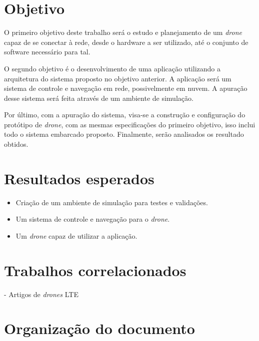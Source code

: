 \documentclass[12pt,a4paper,oneside]{book}
\begin{document}
\section{Objetivo}

O primeiro objetivo deste trabalho será o estudo e planejamento de um \textit{drone} capaz de se conectar à rede, desde o hardware a ser utilizado, até o conjunto de software necessário para tal.

O segundo objetivo é o desenvolvimento de uma aplicação utilizando a arquitetura do sistema proposto no objetivo anterior. A aplicação será um sistema de controle e navegação em rede, possivelmente em nuvem. A apuração desse sistema será feita através de um ambiente de simulação.

Por último, com a apuração do sistema, visa-se a construção e configuração do protótipo de \textit{drone}, com as mesmas especificações do primeiro objetivo, isso inclui todo o sistema embarcado proposto. Finalmente, serão analisados os resultado obtidos.  

\section{Resultados esperados}

\begin{itemize}
\item Criação de um ambiente de simulação para testes e validações.
\item Um sistema de controle e navegação para o \textit{drone}.
\item Um \textit{drone} capaz de utilizar a aplicação.     
\end{itemize}

\section{Trabalhos correlacionados}

 - Artigos de \textit{drones} LTE
 \cite{artigo_relacionado_1}

\section{Organização do documento}
\end{document}
